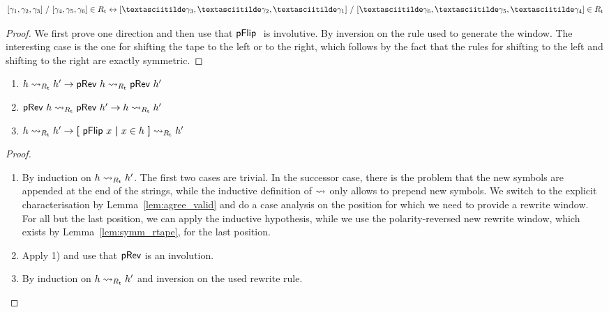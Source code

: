 \begin{lemma}\label{lem:symm_rtape}
  \[\irewwin{\gamma_1}{\gamma_2}{\gamma_3}{\gamma_4}{\gamma_5}{\gamma_6} \in \Rtape \leftrightarrow \irewwin{\pFlipi{\gamma_3}}{\pFlipi{\gamma_2}}{\pFlipi{\gamma_1}}{\pFlipi{\gamma_6}}{\pFlipi{\gamma_5}}{\pFlipi{\gamma_4}} \in \Rtape \]
\end{lemma}
\begin{proof}
  We first prove one direction and then use that $\pFlip$ is involutive.
  By inversion on the rule used to generate the window. The interesting case is the one for shifting the tape to the left or to the right, which follows by the fact that the rules for shifting to the left and shifting to the right are exactly symmetric. 
\end{proof}

\begin{lemma}\label{lem:symm_tape_rew}\leavevmode
  \begin{enumerate}[1)]
    \item $h \rightsquigarrow_{R_{\text{t}}} h' \rightarrow \textsf{pRev}~h \rightsquigarrow_{R_{\text{t}}} \textsf{pRev}~h'$ 
    \item $\textsf{pRev}~h \rightsquigarrow_{R_{\text{t}}} \textsf{pRev}~h' \rightarrow h \rightsquigarrow_{R_{\text{t}}} h'$
    \item $h \rightsquigarrow_{R_{\text{t}}} h' \rightarrow \textbf{[}~ \textsf{pFlip}~x ~\textbf{|}~ x \in h ~\textbf{]} \rightsquigarrow_{R_{\text{t}}} h'$
  \end{enumerate}
\end{lemma}
\begin{proof}
  \begin{enumerate}[1)]
    \item By induction on $h \rightsquigarrow_{R_{\text{t}}} h'$. The first two cases are trivial. 
      In the successor case, there is the problem that the new symbols are appended at the end of the strings, while the inductive definition of $\rightsquigarrow_{}$ only allows to prepend new symbols. We switch to the explicit characterisation by Lemma~\ref{lem:agree_valid} and do a case analysis on the position for which we need to provide a rewrite window. For all but the last position, we can apply the inductive hypothesis, while we use the polarity-reversed new rewrite window, which exists by Lemma~\ref{lem:symm_rtape}, for the last position.
    \item Apply 1) and use that $\textsf{pRev}$ is an involution.
    \item By induction on $h \rightsquigarrow_{R_{\text{t}}} h'$ and inversion on the used rewrite rule.
  \end{enumerate}
\end{proof}

